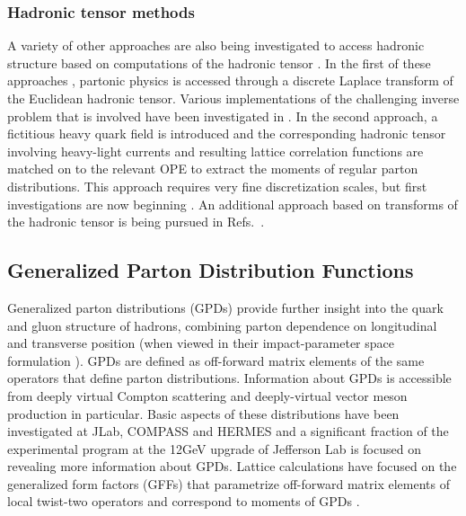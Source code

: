 \subsubsection{Hadronic tensor methods}

A variety of other approaches are also being investigated to access hadronic structure based on computations of the hadronic tensor \cite{Liu:1993cv,Aglietti:1998mz,Detmold:2005gg,Liu:2016djw}. In the first of these approaches \cite{Liu:1993cv,Liu:2016djw}, partonic physics is accessed through a discrete Laplace transform of the Euclidean hadronic tensor. Various implementations of the challenging inverse problem that is involved have been investigated in \cite{Liang:2017mye}. In the second approach, a fictitious heavy quark field is introduced and the corresponding hadronic tensor involving heavy-light currents and resulting lattice correlation functions are matched on to the relevant OPE to extract the moments of regular parton distributions. This approach requires very fine discretization scales, but first investigations are now beginning \cite{Detmold:2018kwu}. 
An additional approach based on transforms of the hadronic tensor is being pursued in Refs.~\cite{Chambers:2017dov}.

\subsection{Generalized Parton Distribution Functions}

Generalized parton distributions (GPDs) \cite{Ji:2001wha,Radyushkin:1997ki,Diehl:2003ny,Belitsky:2005qn} provide further insight into the quark and gluon structure of hadrons, combining parton dependence on longitudinal and transverse position (when viewed in their impact-parameter space formulation \cite{Burkardt:2000za}). GPDs are defined as  off-forward matrix elements of the same operators that define parton distributions.   Information about GPDs is accessible from deeply virtual Compton scattering and deeply-virtual vector meson production in particular. Basic aspects of these distributions have been investigated at JLab, COMPASS and HERMES and a significant fraction of the experimental program at the 12GeV upgrade of Jefferson Lab is focused on revealing more  information about  GPDs. Lattice calculations have focused on the generalized form factors (GFFs) that parametrize off-forward matrix elements of local twist-two operators and correspond to moments of GPDs \cite{Hagler:2003jd,Hagler:2007xi,Hagler:2009mb}. 

